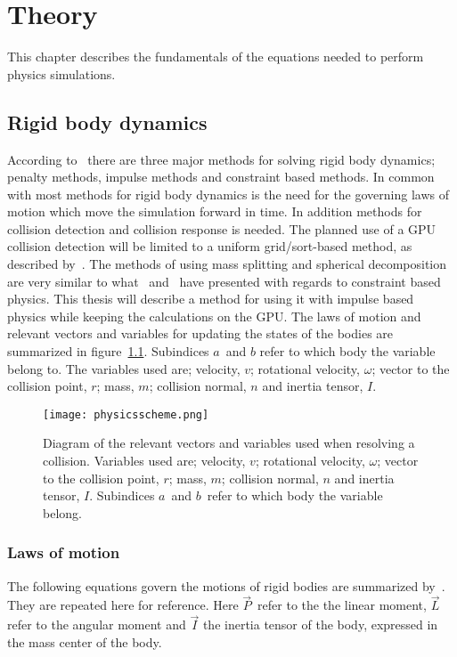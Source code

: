 \chapter{Theory}\label{cha:theory}
This chapter describes the fundamentals of the equations needed to perform physics simulations.
\section{Rigid body dynamics}
According to~\cite{baberrigid} there are three major methods for solving rigid body
dynamics; penalty methods, impulse methods and constraint based methods.
In common with most methods for rigid body dynamics is the need for the governing laws of
motion which move the simulation forward in time. In addition methods for collision detection
and collision response is needed. The planned use of a GPU collision
detection will be limited to a uniform grid/sort-based method, as described by~\cite{gpugems}.
The methods of using mass splitting and spherical decomposition are very similar
to what~\cite{flex} and~\cite{bulletPipeline} have presented with regards to
constraint based physics. This thesis will describe a method for using it with
impulse based physics while keeping the calculations on the GPU. The laws of motion and relevant vectors and variables
for updating the states of the bodies are summarized in figure~\ref{fig:diag}.
Subindices $a$ and $b$ refer to which body the variable belong to.
The variables used are; velocity, $v$; rotational velocity, $\omega$; vector to
the collision point, $r$; mass, $m$; collision normal, $n$ and inertia tensor, $I$.

\begin{figure}[H]
  \centering
  \texttt{[image: physicsscheme.png]}
  \caption{Diagram of the relevant vectors and variables used when resolving a collision. Variables used are; velocity, $v$; rotational velocity, $\omega$; vector to
  the collision point, $r$; mass, $m$; collision normal, $n$ and inertia tensor, $I$.
   Subindices $a$ and $b$ refer to which body the variable belong.}
  \label{fig:diag}
\end{figure}

\subsection{Laws of motion}
The following equations govern the motions of rigid bodies are summarized by~\cite{hansson}. They are repeated here for reference.
Here $\vec{P}$ refer to the the linear moment, $\vec{L}$ refer to the angular
moment and $\vec{I}$ the inertia tensor of the body, expressed in the mass center of the body.

